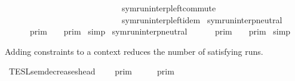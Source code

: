 \begin{isabellebody}
\ \ \ \ \ \ \ \ \ \ \ \ \ \ \ \ \ \ \ \ \ \ \ \ \ \ \ \ symrun{\isacharunderscore}interp{\isacharunderscore}left{\isacharunderscore}commute\isanewline
\ \ \ \ \ \ \ \ \ \ \ \ \ \ \ \ \ \ \ \ \ \ \ \ \ \ \ \ symrun{\isacharunderscore}interp{\isacharunderscore}left{\isacharunderscore}idem\isanewline
\isanewline
%
\isanewline
{}\isamarkupfalse%
\ symrun{\isacharunderscore}interp{\isacharunderscore}neutral{}{\isacharcolon}\isanewline
\ \ {\isacartoucheopen}{\isasymlbrakk}{\isasymlbrakk}\ {\isacharbrackleft}{\isacharbrackright}\ {\isacharat}\ {\isasymGamma}\ {\isasymrbrakk}{\isasymrbrakk}\isactrlsub p\isactrlsub r\isactrlsub i\isactrlsub m\ {\isacharequal}\ {\isasymlbrakk}{\isasymlbrakk}\ {\isasymGamma}\ {\isasymrbrakk}{\isasymrbrakk}\isactrlsub p\isactrlsub r\isactrlsub i\isactrlsub m{\isacartoucheclose}\isanewline
%
\isadelimproof
%
\endisadelimproof
%
\isatagproof
{}\isamarkupfalse%
\ simp%
\endisatagproof
{\isafoldproof}%
%
\isadelimproof
\isanewline
%
\endisadelimproof
\isanewline
{}\isamarkupfalse%
\ symrun{\isacharunderscore}interp{\isacharunderscore}neutral{}{\isacharcolon}\isanewline
\ \ {\isacartoucheopen}{\isasymlbrakk}{\isasymlbrakk}\ {\isasymGamma}\ {\isacharat}\ {\isacharbrackleft}{\isacharbrackright}\ {\isasymrbrakk}{\isasymrbrakk}\isactrlsub p\isactrlsub r\isactrlsub i\isactrlsub m\ {\isacharequal}\ {\isasymlbrakk}{\isasymlbrakk}\ {\isasymGamma}\ {\isasymrbrakk}{\isasymrbrakk}\isactrlsub p\isactrlsub r\isactrlsub i\isactrlsub m{\isacartoucheclose}\isanewline
%
\isadelimproof
%
\endisadelimproof
%
\isatagproof
{}\isamarkupfalse%
\ simp%
\endisatagproof
{\isafoldproof}%
%
\isadelimproof
%
\endisadelimproof
%
\isadelimdocument
%
\endisadelimdocument
%
\isatagdocument
%
\isamarkuptrue%
%
\endisatagdocument
{\isafolddocument}%
%
\isadelimdocument
%
\endisadelimdocument
%
\begin{isamarkuptext}%
Adding constraints to a context reduces the number of satisfying runs.%
\end{isamarkuptext}\isamarkuptrue%
\isamarkupfalse%
\ TESL{\isacharunderscore}sem{\isacharunderscore}decreases{\isacharunderscore}head{\isacharcolon}\isanewline
\ \ {\isacartoucheopen}{\isasymlbrakk}{\isasymlbrakk}\ {\isasymGamma}\ {\isasymrbrakk}{\isasymrbrakk}\isactrlsub p\isactrlsub r\isactrlsub i\isactrlsub m\ {\isasymsupseteq}\ {\isasymlbrakk}{\isasymlbrakk}\ {\isasymgamma}\ {\isacharhash}\ {\isasymGamma}\ {\isasymrbrakk}{\isasymrbrakk}\isactrlsub p\isactrlsub r\isactrlsub i\isactrlsub m{\isacartoucheclose}\isanewline

\end{isabellebody}
